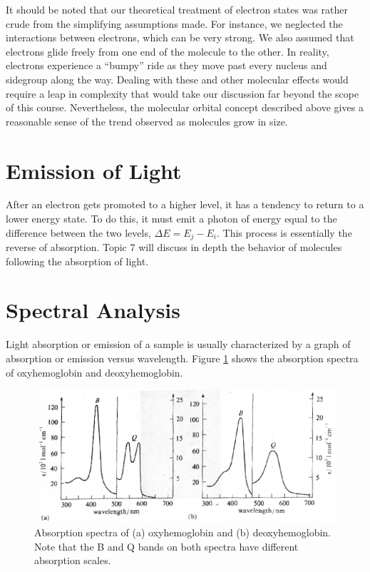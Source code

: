 It should be noted that our theoretical treatment of electron states was rather crude from the simplifying assumptions made. For instance, we neglected the interactions between electrons, which can be very strong. We also assumed that electrons glide freely from one end of the molecule to the other. In reality, electrons experience a ``bumpy'' ride as they move past every nucleus and sidegroup along the way. Dealing with these and other molecular effects would require a leap in complexity that would take our discussion far beyond the scope of this course. Nevertheless, the molecular orbital concept described above gives a reasonable sense of the trend observed as molecules grow in size. 

\section{Emission of Light}

After an electron gets promoted to a higher level, it has a tendency to return to a lower energy state.  To do this, it must emit a photon of energy equal to the difference between the two levels, $\Delta E = E_j - E_i$.  This process is essentially the reverse of absorption.  Topic 7 will discuss in depth the behavior of molecules following the absorption of light.

\section{Spectral Analysis}

Light absorption or emission of a sample is usually characterized by a graph of absorption or emission versus wavelength.  Figure \ref{Fig6-7} shows the absorption spectra of oxyhemoglobin and deoxyhemoglobin.
\begin{figure}[h]
	\centering
	\includegraphics[width=4.5in]{./figures/Topic6/Fig6-7.png}
	\caption{Absorption spectra of (a) oxyhemoglobin and (b) deoxyhemoglobin.  Note that the B and Q bands on both spectra have different absorption scales.}
	\label{Fig6-7}
\end{figure}

